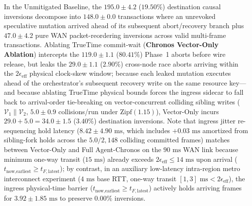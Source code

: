 \documentclass[conference,10pt]{IEEEtran}
\begin{document}
In the Unmitigated Baseline, the $195.0 \pm 4.2$ ($19.50\%$) destination causal inversions decompose into $148.0 \pm 0.0$ transactions where an unrevoked speculative mutation arrived ahead of its subsequent abort/recovery branch plus $47.0 \pm 4.2$ pure WAN packet-reordering inversions across valid multi-frame transactions. Ablating TrueTime commit-wait (\textbf{Chronos Vector-Only Ablation}) intercepts the $119.0 \pm 1.1$ ($80.41\%$) Phase~1 aborts before wire release, but leaks the $29.0 \pm 1.1$ ($2.90\%$) cross-node race aborts arriving within the $2\epsilon_{\text{eff}}$ physical clock-skew window; because each leaked mutation executes ahead of the orchestrator's subsequent recovery write on the same resource key---and because ablating TrueTime physical bounds forces the ingress sidecar to fall back to arrival-order tie-breaking on vector-concurrent colliding sibling writes ($\mathcal{V}_1 \parallel \mathcal{V}_2$, $5.0 \pm 0.9$ collisions/run under $\text{Zipf}(1.15)$), Vector-Only incurs $29.0 + 5.0 = 34.0 \pm 1.5$ ($3.40\%$) destination inversions. Note that ingress jitter re-sequencing hold latency ($8.42 \pm 4.90\text{ ms}$, which includes $+0.03\text{ ms}$ amortized from sibling-fork holds across the $5.0/2{,}148$ colliding committed frames) matches between Vector-Only and Full Agent-Chronos on the $90\text{ ms}$ WAN link because minimum one-way transit ($15\text{ ms}$) already exceeds $2\epsilon_{\text{eff}} \le 14\text{ ms}$ upon arrival ($t_{\text{now},\text{earliest}} \ge t_{F,\text{latest}}$); by contrast, in an auxiliary low-latency intra-region metro interconnect experiment ($4\text{ ms}$ base RTT, one-way transit $[1, 3]\text{ ms} < 2\epsilon_{\text{eff}}$), the ingress physical-time barrier ($t_{\text{now},\text{earliest}} \ge t_{F,\text{latest}}$) actively holds arriving frames for $3.92 \pm 1.85\text{ ms}$ to preserve $0.00\%$ inversions.
\end{document}
